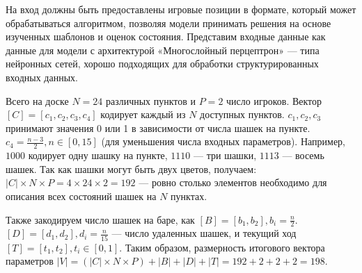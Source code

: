 На вход должны быть предоставлены игровые позиции в формате, который может обрабатываться алгоритмом, позволяя модели принимать решения на основе изученных шаблонов и оценок состояния. Представим входные данные как данные для модели с архитектурой «Многослойный перцептрон» — типа нейронных сетей, хорошо подходящих для обработки структурированных входных данных.

Всего на доске $N = 24$ различных пунктов и $P = 2$ число игроков. Вектор $[C] = [c_1, c_2, c_3, c_4]$ кодирует каждый из $N$ доступных пунктов. $c_1, c_2, c_3$ принимают значения 0 или 1 в зависимости от числа шашек на пункте. $c_4 = \frac{n - 3}{2}, n \in [0, 15]$ (для уменьшения числа входных параметров). Например, $1000$ кодирует одну шашку на пункте, $1110$ — три шашки, $1113$ — восемь шашек. Так как шашки могут быть двух цветов, получаем: $|C| \times N \times P = 4 \times 24 \times 2 = 192$ — ровно столько элементов необходимо для описания всех состояний шашек на $N$ пунктах.

Также закодируем число шашек на баре, как $[B] = [b_1, b_2], b_i = \frac{n}{2}$. $[D] = [d_1, d_2], d_i = \frac{n}{15}$ --- число удаленных шашек, и текущий ход $[T] = [t_1, t_2], t_i \in [0, 1]$. Таким образом, размерность итогового вектора параметров $|V| = (|C| \times N \times P) + |B| + |D| + |T| = 192 + 2 + 2 + 2 = 198$.

